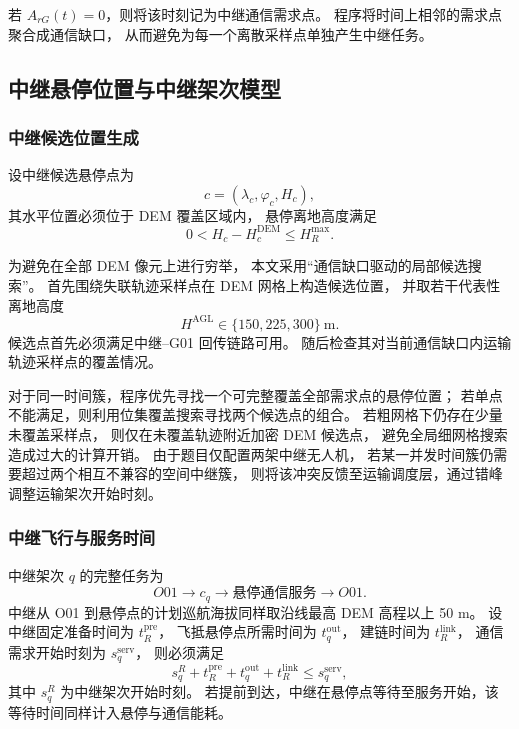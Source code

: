 若 $A_{rG}(t)=0$，则将该时刻记为中继通信需求点。
程序将时间上相邻的需求点聚合成通信缺口，
从而避免为每一个离散采样点单独产生中继任务。

\subsection{中继悬停位置与中继架次模型}

\subsubsection{中继候选位置生成}

设中继候选悬停点为
\[
c=(\lambda_c,\varphi_c,H_c),
\]
其水平位置必须位于 DEM 覆盖区域内，
悬停离地高度满足
\begin{equation}
0<H_c-H_c^{\mathrm{DEM}}
\le H_R^{\max}.
\label{eq:q3-relay-height}
\end{equation}

为避免在全部 DEM 像元上进行穷举，
本文采用“通信缺口驱动的局部候选搜索”。
首先围绕失联轨迹采样点在 DEM 网格上构造候选位置，
并取若干代表性离地高度
\[
H^{\mathrm{AGL}}\in\{150,225,300\}\ \mathrm{m}.
\]
候选点首先必须满足中继--G01 回传链路可用。
随后检查其对当前通信缺口内运输轨迹采样点的覆盖情况。

对于同一时间簇，程序优先寻找一个可完整覆盖全部需求点的悬停位置；
若单点不能满足，则利用位集覆盖搜索寻找两个候选点的组合。
若粗网格下仍存在少量未覆盖采样点，
则仅在未覆盖轨迹附近加密 DEM 候选点，
避免全局细网格搜索造成过大的计算开销。
由于题目仅配置两架中继无人机，
若某一并发时间簇仍需要超过两个相互不兼容的空间中继簇，
则将该冲突反馈至运输调度层，通过错峰调整运输架次开始时刻。

\subsubsection{中继飞行与服务时间}

中继架次 $q$ 的完整任务为
\[
O01\rightarrow c_q
\rightarrow\text{悬停通信服务}
\rightarrow O01.
\]
中继从 O01 到悬停点的计划巡航海拔同样取沿线最高 DEM 高程以上 50 m。
设中继固定准备时间为 $t_R^{\mathrm{pre}}$，
飞抵悬停点所需时间为 $t_q^{\mathrm{out}}$，
建链时间为 $t_R^{\mathrm{link}}$，
通信需求开始时刻为 $s_q^{\mathrm{serv}}$，
则必须满足
\begin{equation}
s_q^{R}
+t_R^{\mathrm{pre}}
+t_q^{\mathrm{out}}
+t_R^{\mathrm{link}}
\le s_q^{\mathrm{serv}},
\label{eq:q3-relay-ready}
\end{equation}
其中 $s_q^R$ 为中继架次开始时刻。
若提前到达，中继在悬停点等待至服务开始，该等待时间同样计入悬停与通信能耗。

